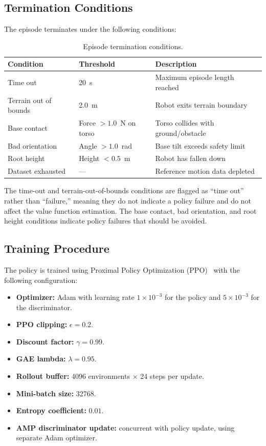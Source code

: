 \subsection{Termination Conditions}
\label{sec:termination}

The episode terminates under the following conditions:

\begin{table}[t]
\centering
\caption{Episode termination conditions.}
\label{tab:termination}
\begin{tabular}{lll}
\toprule
\textbf{Condition} & \textbf{Threshold} & \textbf{Description} \\
\midrule
Time out & 20~s & Maximum episode length reached \\
Terrain out of bounds & 2.0~m & Robot exits terrain boundary \\
Base contact & Force $> 1.0$~N on torso & Torso collides with ground/obstacle \\
Bad orientation & Angle $> 1.0$~rad & Base tilt exceeds safety limit \\
Root height & Height $< 0.5$~m & Robot has fallen down \\
Dataset exhausted & --- & Reference motion data depleted \\
\bottomrule
\end{tabular}
\end{table}

The time-out and terrain-out-of-bounds conditions are flagged as ``time out'' rather than ``failure,'' meaning they do not indicate a policy failure and do not affect the value function estimation. The base contact, bad orientation, and root height conditions indicate policy failures that should be avoided.

\subsection{Training Procedure}
\label{sec:training_procedure}

The policy is trained using Proximal Policy Optimization (PPO)~\cite{schulman2017ppo} with the following configuration:

\begin{itemize}
    \item \textbf{Optimizer:} Adam with learning rate $1 \times 10^{-3}$ for the policy and $5 \times 10^{-3}$ for the discriminator.
    \item \textbf{PPO clipping:} $\epsilon = 0.2$.
    \item \textbf{Discount factor:} $\gamma = 0.99$.
    \item \textbf{GAE lambda:} $\lambda = 0.95$.
    \item \textbf{Rollout buffer:} 4096 environments $\times$ 24 steps per update.
    \item \textbf{Mini-batch size:} 32768.
    \item \textbf{Entropy coefficient:} $0.01$.
    \item \textbf{AMP discriminator update:} concurrent with policy update, using separate Adam optimizer.
\end{itemize}

